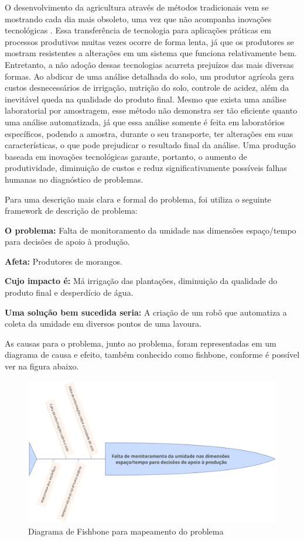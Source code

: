   O desenvolvimento da agricultura através de métodos tradicionais vem se
  mostrando cada dia mais obsoleto, uma vez que não acompanha inovações
  tecnológicas \cite{ROCHA2015}. Essa transferência de tecnologia para aplicações
  práticas em processos produtivos muitas vezes ocorre de forma lenta, já que
  os produtores se mostram resistentes a alterações em um sistema que funciona
  relativamente bem. Entretanto, a não adoção dessas tecnologias acarreta
  prejuízos das mais diversas formas. Ao abdicar de uma análise detalhada do
  solo, um produtor agrícola gera custos desnecessários de irrigação, nutrição
  do solo, controle de acidez, além da inevitável queda na qualidade do produto
  final. Mesmo que exista uma análise laboratorial por amostragem, esse método
  não demonstra ser tão eficiente quanto uma análise automatizada, já que essa
  análise somente é feita em laboratórios específicos, podendo a amostra,
  durante o seu transporte, ter alterações em suas características, o que pode
  prejudicar o resultado final da análise. Uma produção baseada em inovações
  tecnológicas garante, portanto, o aumento de produtividade, diminuição de
  custos e reduz significativamente possíveis falhas humanas no diagnóstico de
  problemas.

  Para uma descrição mais clara e formal do problema, foi utiliza o seguinte
  framework de descrição de problema:

  \textbf{O problema:} Falta de monitoramento da umidade nas dimensões espaço/tempo
  para decisões de apoio à produção.

  \textbf{Afeta:} Produtores de morangos. 

  \textbf{Cujo impacto é:} Má irrigação das plantações, diminuição da qualidade
  do produto final e desperdício de água.

  \textbf{Uma solução bem sucedida seria:} A criação de um robô que automatiza
  a coleta da umidade em diversos pontos de uma lavoura.

  As causas para o problema, junto ao problema, foram representadas em um diagrama
  de causa e efeito, também conhecido como fishbone, conforme é possível ver
  na figura abaixo.

  \begin{figure}[h]
    \centering
    \label{fig01}
      \includegraphics[keepaspectratio=true,scale=0.5]{figuras/fig01.eps}
    \caption{Diagrama de Fishbone para mapeamento do problema}
  \end{figure}


